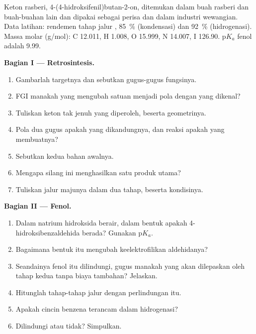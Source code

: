 \begin{problem}
\label{pb:b2:retrosynthesis:1}
Keton rasberi, 4-(4-hidroksifenil)butan-2-on, ditemukan dalam buah rasberi
dan buah-buahan lain dan dipakai sebagai perisa dan dalam industri
wewangian. Data latihan: rendemen tahap jalur , 85~\% (kondensasi)
dan 92~\% (hidrogenasi). Massa molar (\unit{g/mol}): C 12.011, H 1.008, O 15.999, N 14.007,
I 126.90. $\mathrm pK_a$ fenol adalah 9.99.

\medskip
\noindent\textbf{Bagian I --- Retrosintesis.}
\begin{enumerate}
  \item Gambarlah targetnya dan sebutkan gugus-gugus fungsinya.
  \item FGI manakah yang mengubah satuan  menjadi pola dengan
         yang dikenal?
  \item Tuliskan keton tak jenuh yang diperoleh, beserta geometrinya.
  \item Pola dua gugus apakah yang dikandungnya, dan reaksi apakah yang membuatnya?
  \item Sebutkan kedua bahan awalnya.
  \item Mengapa  silang ini menghasilkan satu produk utama?
  \item Tuliskan jalur majunya dalam dua tahap, beserta kondisinya.
\end{enumerate}

\medskip
\noindent\textbf{Bagian II --- Fenol.}
\begin{enumerate}[resume]
  \item Dalam natrium hidroksida berair, dalam bentuk apakah
        4-hidroksibenzaldehida berada? Gunakan
        $\mathrm pK_a$.
  \item Bagaimana bentuk itu mengubah keelektrofilikan aldehidanya?
  \item Seandainya fenol itu dilindungi, gugus manakah yang akan dilepaskan
        oleh tahap kedua tanpa biaya tambahan? Jelaskan.
  \item Hitunglah tahap-tahap jalur dengan perlindungan itu.
  \item Apakah cincin benzena terancam dalam hidrogenasi?
  \item Dilindungi atau tidak? Simpulkan.
\end{enumerate}


\end{problem}
